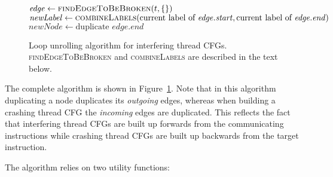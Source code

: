 \begin{figure}
\begin{algorithmic}
       \State $\mathit{edge} \gets \textsc{findEdgeToBeBroken}(t, \{\})$
       \State $\mathit{newLabel} \gets \textsc{combineLabels}(\text{current label of } \mathit{edge}.\mathit{start}, \text{current label of } \mathit{edge}.\mathit{end})$
       \Else
           \State $\mathit{newNode} \gets \text{duplicate } \mathit{edge}.\mathit{end}$
           \EndFor
       \EndIf
    \EndWhile
  \EndFor
\end{algorithmic}
\caption{Loop unrolling algorithm for interfering thread CFGs.
  \textsc{findEdgeToBeBroken} and \textsc{combineLabels} are described
  in the text below.}
\label{fig:derive:store_cfg_unroll_alg}
\end{figure}

The complete algorithm is shown in
Figure~\ref{fig:derive:store_cfg_unroll_alg}.  Note that in this
algorithm duplicating a node duplicates its \emph{outgoing} edges,
whereas when building a crashing thread CFG the \emph{incoming} edges
are duplicated.  This reflects the fact that interfering thread CFGs
are built up forwards from the communicating instructions while crashing
thread CFGs are built up backwards from the target instruction.

The algorithm relies on two utility functions:

